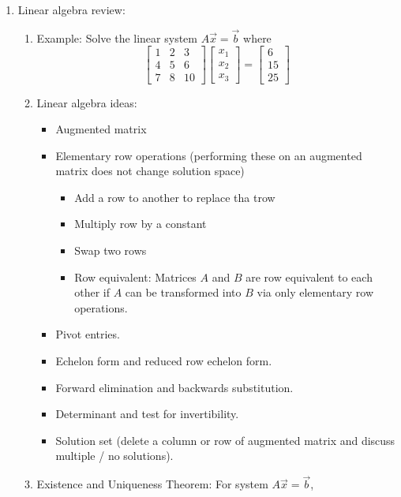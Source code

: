 \documentclass{article}
\theoremstyle{remark}
\begin{document}
\begin{enumerate}
\item Linear algebra review:
\begin{enumerate}
\item Example: Solve the linear system $A \vec{x} = \vec{b}$ where
\[
\left[
\begin{array}{ccc}
1 & 2 & 3 \\
4 & 5 & 6 \\
7 & 8 & 10
\end{array}
\right]
\left[
\begin{array}{c}
x_1 \\
x_2 \\
x_3
\end{array}
\right]
= 
\left[
\begin{array}{c}
6 \\
15 \\
25
\end{array}
\right]
\]
\item Linear algebra ideas:
\begin{itemize}
\item Augmented matrix
\item Elementary row operations (performing these on an augmented matrix does not change solution space)
\begin{itemize}
\item Add a row to another to replace tha trow
\item Multiply row by a constant
\item Swap two rows
\item Row equivalent: Matrices $A$ and $B$ are row equivalent to each other if $A$ can be transformed into $B$ via only elementary row operations.
\end{itemize}
\item Pivot entries.
\item Echelon form and reduced row echelon form.
\item Forward elimination and backwards substitution.
\item Determinant and test for invertibility.
\item Solution set (delete a column or row of augmented matrix and discuss multiple / no solutions).
\end{itemize}
\item Existence and Uniqueness Theorem: For system $A\vec{x} = \vec{b}$,

\end{enumerate}
\end{enumerate}
\end{document}

